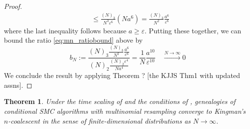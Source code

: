 \documentclass[fleqn]{article}
\newtheorem{thm}{Theorem}
\theoremstyle{definition}
\newcommand{\Ntoinfty}{\overset{N\to\infty}{\longrightarrow}}
\begin{document}
\begin{proof}
\begin{align*}
&\leq \frac{(N)_3}{N^3\varepsilon^6} (Na^6) = \frac{(N)_3}{N^2} \frac{a^6}{\varepsilon^6}
\end{align*}
where the last inequality follows because $a\geq \varepsilon$.
Putting these together, we can bound the ratio \eqref{eq:mn_ratiobound} above by
\begin{equation*}
b_N := \frac{(N)_3 \frac{(N)_3}{N^2} \frac{a^6}{\varepsilon^6}}{(N)_2 \frac{(N)_2 \varepsilon^4}{Na^4}} = \frac{1}{N}\frac{a^{10}}{\varepsilon^{10}} \quad \Ntoinfty 0
\end{equation*}
We conclude the result by applying Theorem ? [the KJJS Thm1 with updated assns].
\end{proof}

\begin{thm}\label{thm:CSMC_newassns}
Under the time scaling of \citet[Theorem 1]{koskela2018} and the conditions of \citet[Lemma 3]{koskela2018}, genealogies of conditional SMC algorithms with multinomial resampling converge to Kingman's $n$-coalescent in the sense of finite-dimensional distributions as $N\to\infty$.
\end{thm}
\end{document}
